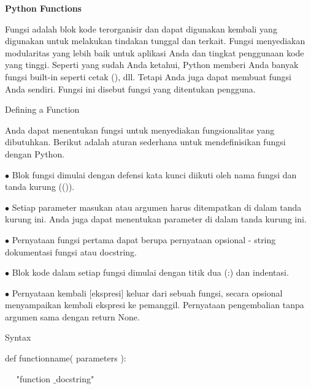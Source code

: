 
\sloppy
\begin{center}{\fontsize{16pt}{16pt}\selectfont \textbf{Python Functions} \\}\end{center} \par
\vspace{12pt}
\noindent 
 \hspace*{0.5in} Fungsi adalah blok kode terorganisir dan dapat digunakan kembali yang digunakan untuk melakukan tindakan tunggal dan terkait. Fungsi menyediakan modularitas yang lebih baik untuk aplikasi Anda dan tingkat penggunaan kode yang tinggi. Seperti yang sudah Anda ketahui, Python memberi Anda banyak fungsi built-in seperti cetak (), dll. Tetapi Anda juga dapat membuat fungsi Anda sendiri. Fungsi ini disebut fungsi yang ditentukan pengguna. \par
\vspace{12pt}
\noindent 
Defining a Function \par
\noindent 
 \hspace*{0.5in} Anda dapat menentukan fungsi untuk menyediakan fungsionalitas yang dibutuhkan. Berikut adalah aturan sederhana untuk mendefinisikan fungsi dengan Python. \par
\noindent 
 $ \bullet $ Blok fungsi dimulai dengan defensi kata kunci diikuti oleh nama fungsi dan tanda kurung (()). \par
\noindent 
 $ \bullet $ Setiap parameter masukan atau argumen harus ditempatkan di dalam tanda kurung ini. Anda juga dapat menentukan parameter di dalam tanda kurung ini. \par
\noindent 
 $ \bullet $ Pernyataan fungsi pertama dapat berupa pernyataan opsional - string dokumentasi fungsi atau docstring. \par
\noindent 
 $ \bullet $ Blok kode dalam setiap fungsi dimulai dengan titik dua (:) dan indentasi. \par
\noindent 
 $ \bullet $ Pernyataan kembali [ekspresi] keluar dari sebuah fungsi, secara opsional menyampaikan kembali ekspresi ke pemanggil. Pernyataan pengembalian tanpa argumen sama dengan return None. \par
\vspace{12pt}
\noindent 
Syntax \par
\noindent 
 \hspace*{0.5in} def functionname( parameters ): \par
\noindent 
~~  \hspace*{0.5in}  \hspace*{0.5in} "function $  \_  $docstring" \par
